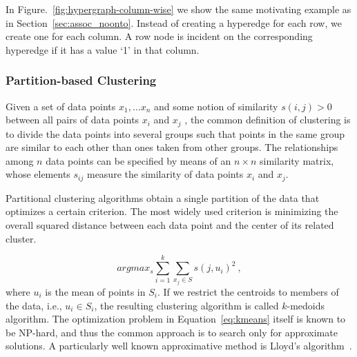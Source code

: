 In Figure.~\ref{fig:hypergraph-column-wise} we show the same motivating example as in Section~\ref{sec:assoc_noonto}. Instead of creating a hyperedge for each row, we create one for each column. A row node is incident on the corresponding hyperedge if it has a value `1' in that column.

\subsubsection{Partition-based Clustering}
Given a set of data points $x_1, \ldots x_n$ and some notion of similarity $s(i,j) > 0$ between all pairs of data points $x_i$ and $x_j$ , the common definition of clustering is to divide the data points into several groups such that points in the same group are similar to each other than ones taken from other groups. The relationships among $n$ data points can be specified by means of an $n \times n$ similarity matrix, whose elements $s_{ij}$ measure the similarity of data points $x_i$ and $x_j$.

Partitional clustering algorithms obtain a single partition of the data that optimizes a certain criterion. The most widely used criterion is minimizing the overall squared distance between each data point and the center of its related cluster.

\begin{equation}
argmax_s\sum^k_{i=1}\sum_{x_j\in S}s(j,u_i)^2~, \label{eq:kmeans}
\end{equation}
where $u_i$ is the mean of points in $S_i$. If we restrict the centroids to members of the data, i.e., $u_i \in S_i$, the resulting clustering algorithm is called $k$-medoids algorithm. The optimization problem in Equation~\ref{eq:kmeans} itself is known to be NP-hard, and thus the common approach is to search only for approximate solutions. A particularly well known approximative method is Lloyd's algorithm~\cite{Lloyd83}.

